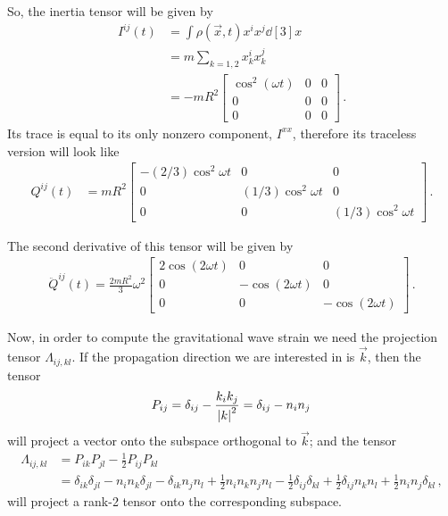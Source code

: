 \documentclass[main.tex]{subfiles}
\begin{document}

So, the inertia tensor will be given by 
%
\begin{align}
I^{ij} (t) &= \int \rho (\vec{x}, t) x^{i} x^{j} \dd[3]{x}  \\
&= m \sum _{k=1, 2} x_k^{i} x_k^{j}  \\
&= - m R^2 \left[\begin{array}{ccc}
\cos^2 (\omega t) & 0  & 0\\ 
0 & 0 & 0 \\
0 & 0 & 0
\end{array}\right] 
\,.
\end{align}
%
Its trace is equal to its only nonzero component, \(I^{xx}\), therefore its traceless version will look like 
%
\begin{align}
Q^{ij} (t) &= mR^2 \left[\begin{array}{ccc}
- (2/3) \cos^2\omega t & 0 & 0 \\ 
0 & (1/3) \cos^2 \omega t & 0 \\ 
0 & 0 & (1/3) \cos^2 \omega t
\end{array}\right]
\,.
\end{align}
%

The second derivative of this tensor will be given by 
%
\begin{align}
\ddot{Q}^{ij}(t) = \frac{2 mR^2}{3} \omega^2 
\left[\begin{array}{ccc}
2\cos(2 \omega t) & 0  & 0\\ 
0 & - \cos(2 \omega t)  & 0 \\
0 & 0 & - \cos(2 \omega t)
\end{array}\right]
\,.
\end{align}


Now, in order to compute the gravitational wave strain we need the projection tensor \(\Lambda_{ij, kl}\).
If the propagation direction we are interested in is \(\vec{k}\), then the tensor 
%
\begin{align}
P_{ij} = \delta_{ij} - \frac{k_i k_j}{\abs{k}^2} = \delta_{ij} - n_i n_j
\,
\end{align}
%
will project a vector onto the subspace orthogonal to \(\vec{k}\); and the tensor 
%
\begin{align}
\Lambda_{ij, kl} &= P_{ik} P_{jl} - \frac{1}{2} P_{ij} P_{kl}  \\
&= \delta_{ik} \delta_{jl} - n_i n_k \delta_{jl} - \delta_{ik} n_j n_l + \frac{1}{2} n_{i} n_k n_j n_l - \frac{1}{2} \delta_{ij} \delta_{kl} + \frac{1}{2} \delta_{ij} n_k n_l + \frac{1}{2} n_i n_j \delta_{kl} 
\,,
\end{align}
%
will project a rank-2 tensor onto the corresponding subspace. 
\end{document}
